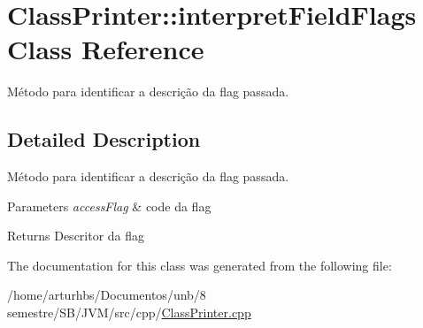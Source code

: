 \hypertarget{classClassPrinter_1_1interpretFieldFlags}{}\section{Class\+Printer\+:\+:interpret\+Field\+Flags Class Reference}
\label{classClassPrinter_1_1interpretFieldFlags}


Método para identificar a descrição da flag passada.  




\subsection{Detailed Description}
Método para identificar a descrição da flag passada. 


\begin{DoxyParams}{Parameters}
{\em access\+Flag} & code da flag \\
\hline
\end{DoxyParams}
\begin{DoxyReturn}{Returns}
Descritor da flag 
\end{DoxyReturn}


The documentation for this class was generated from the following file\+:\begin{DoxyCompactItemize}
\item 
/home/arturhbs/\+Documentos/unb/8 semestre/\+S\+B/\+J\+V\+M/src/cpp/\hyperlink{ClassPrinter_8cpp}{Class\+Printer.\+cpp}\end{DoxyCompactItemize}
